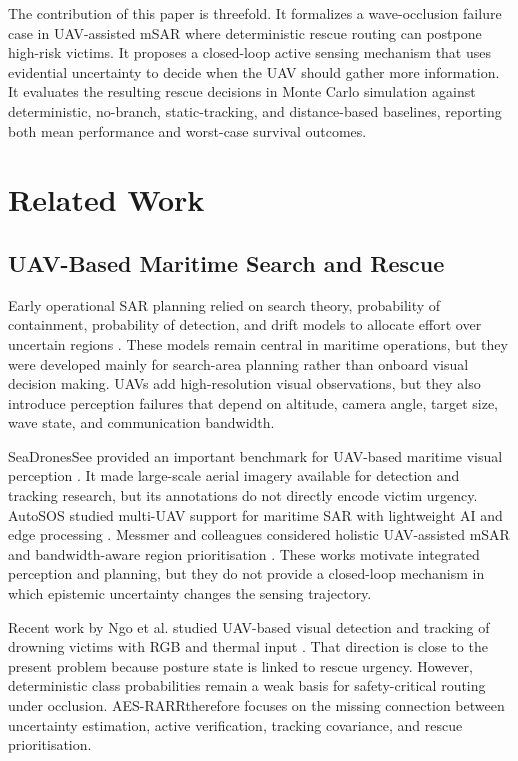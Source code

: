\documentclass[runningheads]{llncs}
\newcommand{\aes}{AES-RARR}
\begin{document}
The contribution of this paper is threefold. It formalizes a wave-occlusion failure case in UAV-assisted mSAR where deterministic rescue routing can postpone high-risk victims. It proposes a closed-loop active sensing mechanism that uses evidential uncertainty to decide when the UAV should gather more information. It evaluates the resulting rescue decisions in Monte Carlo simulation against deterministic, no-branch, static-tracking, and distance-based baselines, reporting both mean performance and worst-case survival outcomes.

\section{Related Work}

\subsection{UAV-Based Maritime Search and Rescue}

Early operational SAR planning relied on search theory, probability of containment, probability of detection, and drift models to allocate effort over uncertain regions \cite{koopman1980search,stone2016optimal,breivik2008sar}. These models remain central in maritime operations, but they were developed mainly for search-area planning rather than onboard visual decision making. UAVs add high-resolution visual observations, but they also introduce perception failures that depend on altitude, camera angle, target size, wave state, and communication bandwidth.

SeaDronesSee provided an important benchmark for UAV-based maritime visual perception \cite{varga2022seadronessee}. It made large-scale aerial imagery available for detection and tracking research, but its annotations do not directly encode victim urgency. AutoSOS studied multi-UAV support for maritime SAR with lightweight AI and edge processing \cite{queralta2020}. Messmer and colleagues considered holistic UAV-assisted mSAR and bandwidth-aware region prioritisation \cite{messmer2024holistic}. These works motivate integrated perception and planning, but they do not provide a closed-loop mechanism in which epistemic uncertainty changes the sensing trajectory.

Recent work by Ngo et al. studied UAV-based visual detection and tracking of drowning victims with RGB and thermal input \cite{ngo2026drowning}. That direction is close to the present problem because posture state is linked to rescue urgency. However, deterministic class probabilities remain a weak basis for safety-critical routing under occlusion. \aes therefore focuses on the missing connection between uncertainty estimation, active verification, tracking covariance, and rescue prioritisation.
\end{document}
